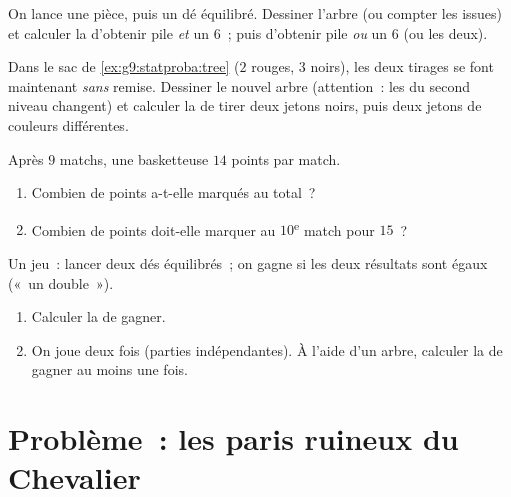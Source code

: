 \begin{exercise}[$\star\star$]\label{exo:g9:statproba:6}
On lance une pièce, puis un dé équilibré. Dessiner l'arbre (ou compter
les issues) et calculer la  d'obtenir pile \emph{et} un $6$~;
puis d'obtenir pile \emph{ou} un $6$ (ou les deux).
\end{exercise}

\begin{exercise}[$\star\star$]\label{exo:g9:statproba:7}
Dans le sac de \cref{ex:g9:statproba:tree} ($2$ rouges, $3$ noirs), les
deux tirages se font maintenant \emph{sans} remise. Dessiner le nouvel
arbre (attention~: les  du second niveau changent) et
calculer la  de tirer deux jetons noirs, puis deux jetons de
couleurs différentes.
\end{exercise}

\begin{exercise}[$\star\star$]\label{exo:g9:statproba:8}
Après $9$ matchs, une basketteuse  $14$ points par match.
\begin{enumerate}
  \item Combien de points a-t-elle marqués au total~?
  \item Combien de points doit-elle marquer au $10$\textsuperscript{e} match pour
         $15$~?
\end{enumerate}
\end{exercise}

\begin{exercise}[$\star\star\star$]\label{exo:g9:statproba:9}
Un jeu~: lancer deux dés équilibrés~; on gagne si les deux résultats
sont égaux («~un double~»).
\begin{enumerate}
  \item Calculer la  de gagner.
  \item On joue deux fois (parties indépendantes). À l'aide d'un arbre,
        calculer la  de gagner au moins une fois.
\end{enumerate}
\end{exercise}

\section{Problème~: les paris ruineux du Chevalier}

